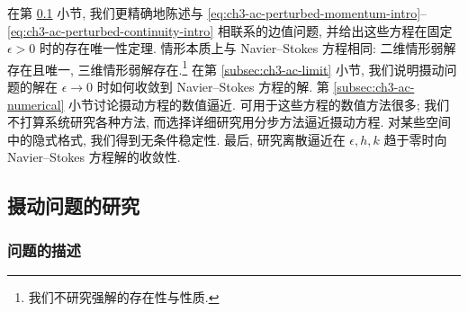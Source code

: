在第 \ref{subsec:ch3-ac-perturbed-problems} 小节, 我们更精确地陈述与 \eqref{eq:ch3-ac-perturbed-momentum-intro}--\eqref{eq:ch3-ac-perturbed-continuity-intro} 相联系的边值问题, 并给出这些方程在固定 $\epsilon>0$ 时的存在唯一性定理. 情形本质上与 Navier--Stokes 方程相同: 二维情形弱解存在且唯一, 三维情形弱解存在.\footnote{我们不研究强解的存在性与性质.} 在第 \ref{subsec:ch3-ac-limit} 小节, 我们说明摄动问题的解在 $\epsilon\to0$ 时如何收敛到 Navier--Stokes 方程的解. 第 \ref{subsec:ch3-ac-numerical} 小节讨论摄动方程的数值逼近. 可用于这些方程的数值方法很多; 我们不打算系统研究各种方法, 而选择详细研究用分步方法逼近摄动方程. 对某些空间中的隐式格式, 我们得到无条件稳定性. 最后, 研究离散逼近在 $\epsilon,h,k$ 趋于零时向 Navier--Stokes 方程解的收敛性.

\subsection{摄动问题的研究}
\label{subsec:ch3-ac-perturbed-problems}

\subsubsection{问题的描述}
\label{subsubsec:ch3-ac-description}

